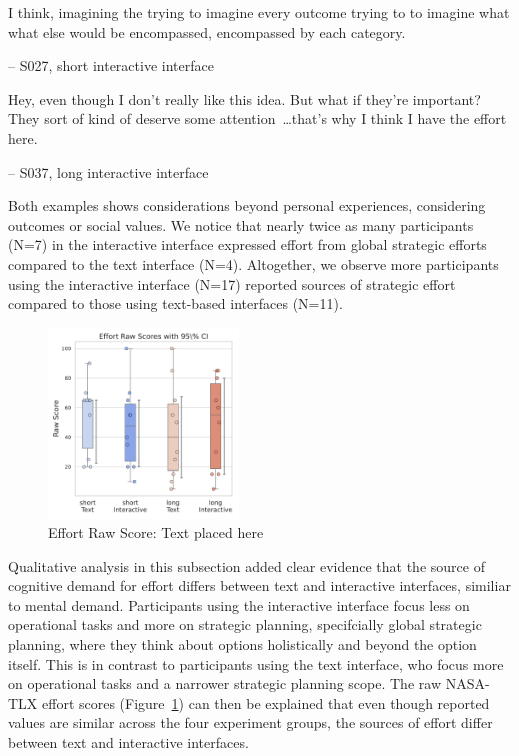 \begin{displayquote}
I think, imagining the trying to imagine every outcome trying to to imagine what what else would be encompassed, encompassed by each category.

\noindent \hfill -- S027, short interactive interface
\end{displayquote}

\begin{displayquote}
Hey, even though I don't really like this idea. But what if they're important? They sort of kind of deserve some attention~\ldots that's why I think I have the effort here.

\noindent \hfill -- S037, long interactive interface
\end{displayquote}
    
Both examples shows considerations beyond personal experiences, considering outcomes or social values. We notice that nearly twice as many participants (N=7) in the interactive interface expressed effort from global strategic efforts compared to the text interface (N=4). Altogether, we observe more participants using the interactive interface (N=17) reported sources of strategic effort compared to those using text-based interfaces (N=11). 

\begin{figure} %
    \centering
    \includegraphics[width=0.45\textwidth, trim=0 13 0 13, clip]{content/image/cog/Effort_scores.pdf}
    \captionsetup{width=0.40\textwidth, justification=justified} %
    \caption{Effort Raw Score: Text placed here}
    \label{fig:effort_cog_score}
\end{figure}

Qualitative analysis in this subsection added clear evidence that the source of cognitive demand for effort differs between text and interactive interfaces, similiar to mental demand. Participants using the interactive interface focus less on operational tasks and more on strategic planning, specifcially global strategic planning, where they think about options holistically and beyond the option itself. This is in contrast to participants using the text interface, who focus more on operational tasks and a narrower strategic planning scope. The raw NASA-TLX effort scores (Figure~\ref{fig:effort_cog_score}) can then be explained that even though reported values are similar across the four experiment groups, the sources of effort differ between text and interactive interfaces.

